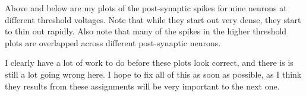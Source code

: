 \documentclass[a4paper,12pt]{article}
\begin{document}
Above and below are my plots of the post-synaptic spikes for nine neurons at different threshold voltages. Note that while they start out very dense, they start to thin out rapidly. Also note that many of the spikes in the higher threshold plots are overlapped across different post-synaptic neurons. 

\vspace{2mm}

I clearly have a lot of work to do before these plots look correct, and there is is still a lot going wrong here. I hope to fix all of this as soon as possible, as I think they results from these assignments will be very important to the next one. 

\begin{center}
\begin{figure}[ht!]
\end{figure}
\end{center}
\end{document}
